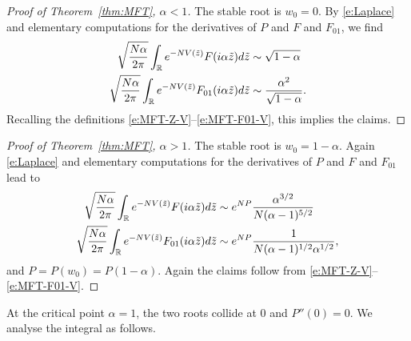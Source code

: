 \documentclass[11pt]{amsart}
\numberwithin{equation}{section}
\numberwithin{theorem}{section}
\begin{document}
\begin{proof}[Proof of Theorem~\ref{thm:MFT}, $\alpha<1$]
  The stable root is $w_0=0$.
  By \eqref{e:Laplace} and elementary computations for the derivatives of $P$ and $F$ and $F_{01}$, we find
  \begin{align}
    \sqrt{\frac{N\alpha}{2\pi}} \int_{\mathbb{R}} e^{-NV(\tilde z)} F(i\alpha\tilde z) d\tilde z
    &\sim
      \sqrt{1-\alpha}
    \\
    \sqrt{\frac{N\alpha}{2\pi}}
    \int_{\mathbb{R}} e^{-NV(\tilde z)} F_{01}(i\alpha\tilde z) d\tilde z
    &\sim
      \frac{\alpha^2}{\sqrt{1-\alpha}}.
  \end{align}
  Recalling the definitions \eqref{e:MFT-Z-V}--\eqref{e:MFT-F01-V}, this implies the claims.
\end{proof}

\begin{proof}[Proof of Theorem~\ref{thm:MFT}, $\alpha>1$]
  The stable root is $w_0=1-\alpha$.
  Again \eqref{e:Laplace} and elementary computations for the derivatives of $P$ and $F$ and $F_{01}$
  lead to
  \begin{align}\label{e:MFT-gt1-Z}
    \sqrt{\frac{N\alpha}{2\pi}}
    \int_{\mathbb{R}} e^{-NV(\tilde z)} F(i\alpha\tilde z) d\tilde z
    &\sim
    e^{NP}    \frac{\alpha^{3/2}}{N(\alpha-1)^{5/2}}
    \\
        \sqrt{\frac{N\alpha}{2\pi}}
    \int_{\mathbb{R}} e^{-NV(\tilde z)} F_{01}(i\alpha\tilde z) d\tilde z
    &\sim
    e^{NP}    \frac{1}{N(\alpha-1)^{1/2}\alpha^{1/2}},
  \end{align}
  and $P = P(w_0)=P(1-\alpha)$. Again the claims follow from  \eqref{e:MFT-Z-V}--\eqref{e:MFT-F01-V}.
\end{proof}

At the critical point $\alpha=1$, the two roots collide at $0$ and $P''(0)=0$.
We analyse the integral as follows.
\end{document}
